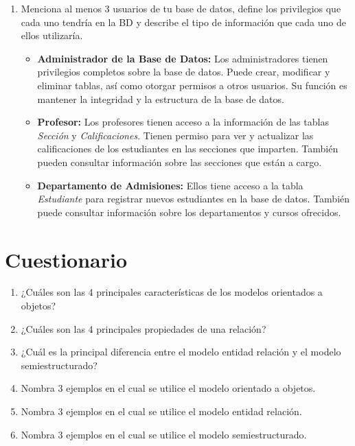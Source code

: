 \documentclass[a4paper,12pt]{article}
\begin{document}
\begin{enumerate}
    \item \textcolor{sun}{Menciona al menos 3 usuarios de tu base de datos, define los privilegios que cada
    uno tendría en la BD y describe el tipo de información que cada uno de ellos
    utilizaría.}

    \begin{itemize}
      \item \textbf{Administrador de la Base de Datos:} Los administradores tienen privilegios completos sobre la base de datos. Puede crear, modificar y eliminar tablas, así como otorgar permisos a otros usuarios. Su función es mantener la integridad y la estructura de la base de datos.
    
      \item \textbf{Profesor:} Los profesores tienen acceso a la información de las tablas \textit{Sección} y \textit{Calificaciones}. Tienen permiso para ver y actualizar las calificaciones de los estudiantes en las secciones que imparten. También pueden consultar información sobre las secciones que están a cargo.      
    
      \item \textbf{Departamento de Admisiones:} Ellos tiene acceso a la tabla \textit{Estudiante} para registrar nuevos estudiantes en la base de datos. También puede consultar información sobre los departamentos y cursos ofrecidos.          
    \end{itemize}

  
\end{enumerate}


\section*{Cuestionario}

\begin{enumerate}
    \item \textcolor{sun}{¿Cuáles son las 4 principales características de los modelos orientados a objetos?}
    \item \textcolor{sun}{¿Cuáles son las 4 principales propiedades de una relación?}
    \item \textcolor{sun}{¿Cuál es la principal diferencia entre el modelo entidad relación y el modelo
    semiestructurado?}
    \item \textcolor{sun}{Nombra 3 ejemplos en el cual se utilice el modelo orientado a objetos.}
    \item \textcolor{sun}{Nombra 3 ejemplos en el cual se utilice el modelo entidad relación.}
    \item \textcolor{sun}{Nombra 3 ejemplos en el cual se utilice el modelo semiestructurado.}
\end{enumerate}
\end{document}
